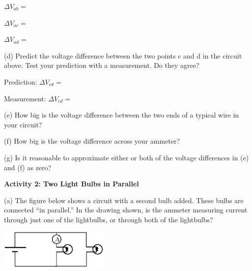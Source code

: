\vspace{0.3 in}
\hspace{0.5 in} $\Delta V_{ab} = $ \par
\hspace{0.5 in} $\Delta V_{ac} = $ \par
\hspace{0.5 in} $\Delta V_{ad} = $ \par
\vspace{0.6 in}

(d)  Predict the voltage difference between the two points c and d in the circuit above.  Test your prediction with a measurement.  Do they agree? \par
\hspace{0.5 in} Prediction:   $\Delta V_{cd} = $ \par
\vspace{0.2 in}
\hspace{0.5 in} Measurement:   $\Delta V_{cd} = $ \par
\vspace{0.3 in}
(e) How big is the voltage difference between the two ends of a typical wire in your circuit?
\vspace{0.6 in}



(f) How big is the voltage difference across your ammeter?  
\vspace{0.6 in}



(g) Is it reasonable to approximate either or both of the voltage differences in (e) and (f) as zero?
\vspace{0.6 in}



\textbf{Activity 2: Two Light Bulbs in Parallel}

(a) The figure below shows a circuit with a second bulb added.  These bulbs are connected ``in parallel.''  In the drawing shown, is the ammeter measuring current through just one of the lightbulbs, or through both of the lightbulbs?
\vspace{-0.1in}
\begin{flushright}
\includegraphics[width=0.4\textwidth]{electric_circuits/circ_diag3.eps}
\end{flushright}
\vspace{-0.1in}


